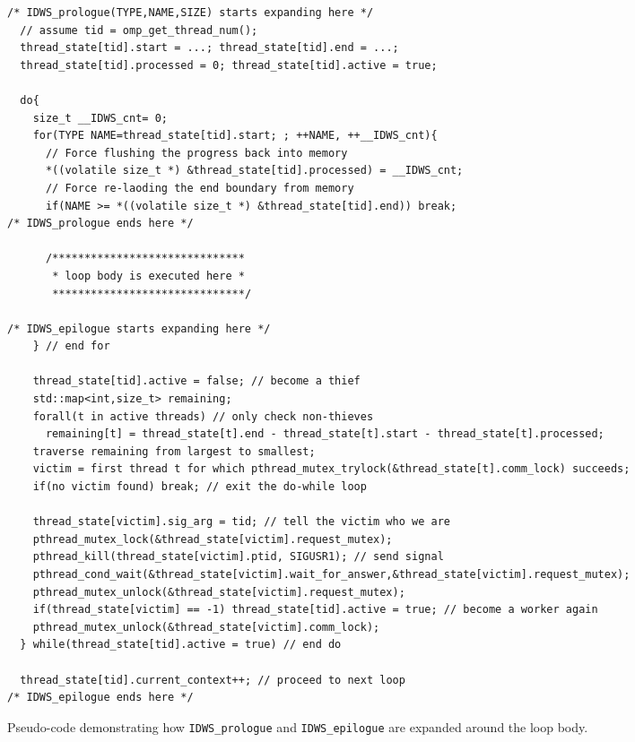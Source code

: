 \documentclass{acm_proc_article-sp}
\begin{document}
\begin{code*}
\begin{lstlisting}
/* IDWS_prologue(TYPE,NAME,SIZE) starts expanding here */
  // assume tid = omp_get_thread_num();
  thread_state[tid].start = ...; thread_state[tid].end = ...;
  thread_state[tid].processed = 0; thread_state[tid].active = true;
  
  do{
    size_t __IDWS_cnt= 0;
    for(TYPE NAME=thread_state[tid].start; ; ++NAME, ++__IDWS_cnt){
      // Force flushing the progress back into memory
      *((volatile size_t *) &thread_state[tid].processed) = __IDWS_cnt;
      // Force re-laoding the end boundary from memory
      if(NAME >= *((volatile size_t *) &thread_state[tid].end)) break;
/* IDWS_prologue ends here */

      /******************************
       * loop body is executed here *
       ******************************/

/* IDWS_epilogue starts expanding here */
    } // end for
    
    thread_state[tid].active = false; // become a thief
    std::map<int,size_t> remaining;
    forall(t in active threads) // only check non-thieves
      remaining[t] = thread_state[t].end - thread_state[t].start - thread_state[t].processed;
    traverse remaining from largest to smallest;
    victim = first thread t for which pthread_mutex_trylock(&thread_state[t].comm_lock) succeeds;
    if(no victim found) break; // exit the do-while loop
    
    thread_state[victim].sig_arg = tid; // tell the victim who we are
    pthread_mutex_lock(&thread_state[victim].request_mutex);
    pthread_kill(thread_state[victim].ptid, SIGUSR1); // send signal
    pthread_cond_wait(&thread_state[victim].wait_for_answer,&thread_state[victim].request_mutex);
    pthread_mutex_unlock(&thread_state[victim].request_mutex);
    if(thread_state[victim] == -1) thread_state[tid].active = true; // become a worker again
    pthread_mutex_unlock(&thread_state[victim].comm_lock);
  } while(thread_state[tid].active = true) // end do
  
  thread_state[tid].current_context++; // proceed to next loop
/* IDWS_epilogue ends here */
\end{lstlisting}
\caption{Pseudo-code demonstrating how \texttt{IDWS\_prologue} and 
\texttt{IDWS\_epilogue} are expanded around the loop body.}
\label{code:macros}
\end{code*}
\end{document}
